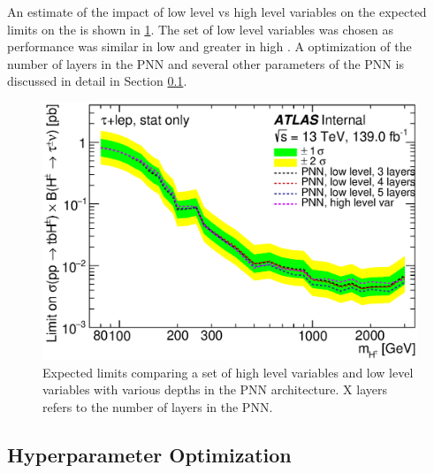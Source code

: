       An estimate of the impact of low level vs high level variables on the expected limits on the \HpmLong is shown in \ref{fig:variable-comparison-limits}. The set of low level variables was chosen as performance was similar in low \mHpm and greater in high \mHpm. A optimization of the number of layers in the PNN and several other parameters of the PNN is discussed in detail in Section \ref{ssec:hpo}.
			\begin{figure}	
				\begin{center}
					\includegraphics[width=.75\textwidth,keepaspectratio=true]{chapters/chapter6_HPlus/images/taulep_limits_PNN_low_lv_vs_high_lv.eps}
				\end{center}
				\caption{Expected limits comparing a set of high level variables and low level variables with various depths in the PNN architecture. X layers refers to the number of layers in the PNN. }
				\label{fig:variable-comparison-limits}
			\end{figure}	

		\subsection{Hyperparameter Optimization}\label{ssec:hpo}

